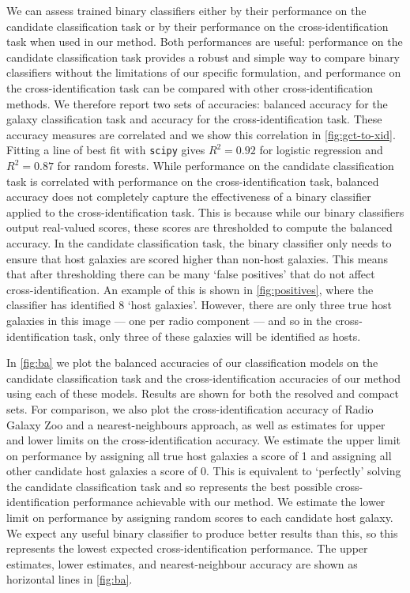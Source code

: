 \documentclass[fleqn,usenatbib,usedcolumn]{mnras}
\newcommand{\edited}[1]{#1}
\begin{document}
    \edited{We can assess trained binary classifiers either by their performance on
    the candidate classification task or by their performance on the
    cross-identification task when used in our method. Both performances are
    useful: performance on the candidate classification task provides a robust
    and simple way to compare binary classifiers without the limitations of
    our specific formulation, and performance on the cross-identification task
    can be compared with other cross-identification methods. We therefore
    report two sets of accuracies: balanced accuracy for the galaxy
    classification task and accuracy for the cross-identification task. These
    accuracy measures are correlated and we show this correlation in
    \autoref{fig:gct-to-xid}. Fitting a line of best fit with \texttt{scipy}
    gives $R^2 = 0.92$ for logistic regression and $R^2 = 0.87$ for random
    forests. While performance on the candidate classification task is correlated
    with performance on the cross-identification task, balanced accuracy does
    not completely capture the effectiveness of a binary classifier applied to
    the cross-identification task. \edited{This is because while our binary
    classifiers output real-valued scores, these scores are thresholded to
    compute the balanced accuracy}. In the candidate classification
    task, the binary classifier only needs to ensure that host galaxies are
    \edited{scored higher} than non-host galaxies. This means
    \edited{that after thresholding} there can be
    many `false positives' that do not affect cross-identification. An example
    of this is shown in \autoref{fig:positives}, where the classifier has
    identified 8 `host galaxies'. However, there are only three true host
    galaxies in this image --- one per radio component --- and so in the
    cross-identification task, only three of these galaxies will be identified
    as hosts.}

    In \autoref{fig:ba} we plot \edited{the balanced accuracies of our classification models
    on the candidate classification task and the cross-identification
    accuracies of our method using each of these models. Results are shown for both
    the resolved and compact sets.} For comparison, we also plot the cross-identification accuracy of Radio Galaxy
    Zoo and a nearest-neighbours approach, as well as estimates for upper and
    lower limits on the cross-identification accuracy. \edited{We estimate the upper limit on performance by assigning all
    true host galaxies a score of 1 and
    assigning all other candidate host galaxies a score of 0. This
    is equivalent to `perfectly' solving the candidate classification task and so
    represents the best possible cross-identification performance achievable
    with our method. We estimate the lower limit on performance by \edited{
    assigning random scores to each candidate host galaxy}. We expect any
    useful binary classifier to produce better
    results than this, so this represents the lowest expected
    cross-identification performance.} The upper estimates, lower estimates,
    and nearest-neighbour accuracy are shown as horizontal lines in
    \autoref{fig:ba}.
\end{document}
